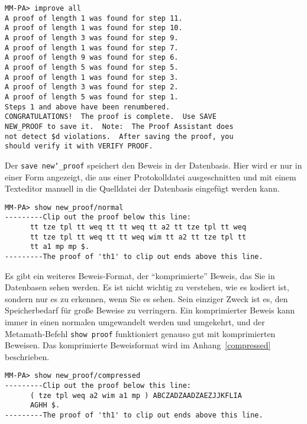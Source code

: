 \begin{verbatim}
MM-PA> improve all
A proof of length 1 was found for step 11.
A proof of length 1 was found for step 10.
A proof of length 3 was found for step 9.
A proof of length 1 was found for step 7.
A proof of length 9 was found for step 6.
A proof of length 5 was found for step 5.
A proof of length 1 was found for step 3.
A proof of length 3 was found for step 2.
A proof of length 5 was found for step 1.
Steps 1 and above have been renumbered.
CONGRATULATIONS!  The proof is complete.  Use SAVE
NEW_PROOF to save it.  Note:  The Proof Assistant does
not detect $d violations.  After saving the proof, you
should verify it with VERIFY PROOF.
\end{verbatim}

Der \texttt{save new{\char`\_}proof} speichert den Beweis in der Datenbasis.  Hier wird er nur in einer Form angezeigt, die aus einer Protokolldatei ausgeschnitten und mit einem Texteditor manuell in die Quelldatei der Datenbasis eingefügt werden kann.

\begin{verbatim}
MM-PA> show new_proof/normal
---------Clip out the proof below this line:
      tt tze tpl tt weq tt tt weq tt a2 tt tze tpl tt weq
      tt tze tpl tt weq tt tt weq wim tt a2 tt tze tpl tt
      tt a1 mp mp $.
---------The proof of 'th1' to clip out ends above this line.
\end{verbatim}

Es gibt ein weiteres Beweis-Format, der "`komprimierte"' Beweis, das Sie in Datenbasen sehen werden.  Es ist nicht wichtig zu verstehen, wie es kodiert ist, sondern nur es zu erkennen, wenn Sie es sehen.  Sein einziger Zweck ist es, den Speicherbedarf für große Beweise zu verringern.  Ein komprimierter Beweis kann immer in einen normalen umgewandelt werden und umgekehrt, und der Metamath-Befehl \texttt{show proof} funktioniert genauso gut mit komprimierten Beweisen.  Das komprimierte Beweisformat wird im Anhang~\ref{compressed} beschrieben.

\begin{verbatim}
MM-PA> show new_proof/compressed
---------Clip out the proof below this line:
      ( tze tpl weq a2 wim a1 mp ) ABCZADZAADZAEZJJKFLIA
      AGHH $.
---------The proof of 'th1' to clip out ends above this line.
\end{verbatim}


